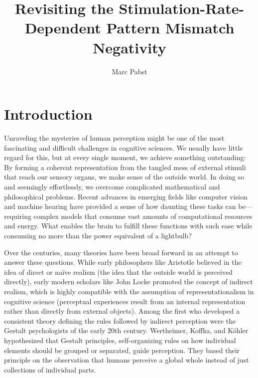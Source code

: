 \documentclass[twoside, man, a4paper,12pt, nofontenc]{apa7}
\title{Revisiting the Stimulation-Rate-Dependent Pattern Mismatch
Negativity}
\author{Marc Pabst}
\date{}
\begin{document}
\maketitle


\renewcommand*\contentsname{}

\setcounter{tocdepth}{3}
\tableofcontents

\newpage

\hypertarget{introduction}{%
\section{Introduction}\label{introduction}}

Unraveling the mysteries of human perception might be one of the most
fascinating and difficult challenges in cognitive sciences. We usually
have little regard for this, but at every single moment, we achieve
something outstanding: By forming a coherent representation from the
tangled mess of external stimuli that reach our sensory organs, we make
sense of the outside world. In doing so and seemingly effortlessly, we
overcome complicated mathematical and philosophical problems. Recent
advances in emerging fields like computer vision and machine hearing
have provided a sense of how daunting these tasks can be---requiring
complex models that consume vast amounts of computational resources and
energy. What enables the brain to fulfill these functions with such ease
while consuming no more than the power equivalent of a lightbulb?

Over the centuries, many theories have been broad forward in an attempt
to answer these questions. While early philosophers like Aristotle
believed in the idea of direct or naïve realism (the idea that the
outside world is perceived directly), early modern scholars like John
Locke promoted the concept of indirect realism, which is highly
compatible with the assumption of representationalism in cognitive
science (perceptual experiences result from an internal representation
rather than directly from external objects). Among the first who
developed a consistent theory defining the rules followed by indirect
perception were the Gestalt psychologists of the early 20th century.
Wertheimer, Koffka, and Köhler hypothesized that Gestalt principles,
self-organizing rules on how individual elements should be grouped or
separated, guide perception. They based their principle on the
observation that humans perceive a global whole instead of just
collections of individual parts.
\end{document}
